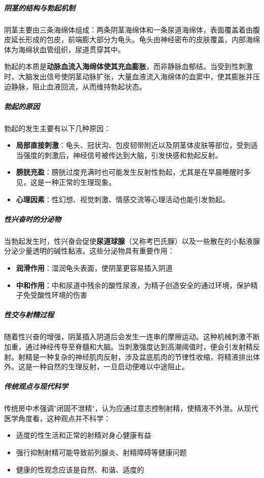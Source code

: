 \subparagraph{阴茎的结构与勃起机制}

阴茎主要由三条海绵体组成：两条阴茎海绵体和一条尿道海绵体，表面覆盖着由腹皮延长形成的包皮，前端膨大部分为龟头。龟头由神经密布的皮肤覆盖，内部海绵体为海绵状血管组织，尿道贯穿其中。

勃起的本质是\textbf{动脉血流入海绵体使其充血膨胀}，而非静脉血郁结。当受到性刺激时，大脑发出信号使阴茎动脉扩张，大量血液流入海绵体的血窦中，使其膨胀并压迫静脉，阻止血液回流，从而维持勃起状态。

\subparagraph{勃起的原因}

勃起的发生主要有以下几种原因：
\begin{itemize}
    \item \textbf{局部直接刺激}：龟头、冠状沟、包皮韧带附近以及阴茎体皮肤等部位，受到适当强度的刺激后，神经信号被传达到大脑，引发快感和勃起反射。
    \item \textbf{膀胱充盈}：膀胱过度充满时也可能发生反射性勃起，尤其是在早晨睡醒时多见，这是一种正常的生理现象。
    \item \textbf{心理因素}：性幻想、视觉刺激、情感交流等心理活动也能引发勃起。
\end{itemize}

\subparagraph{性兴奋时的分泌物}

当勃起发生时，性兴奋会促使\textbf{尿道球腺}（又称考巴氏腺）以及一些散在的小黏液腺分泌少量透明的碱性黏液。这些分泌物具有重要作用：
\begin{itemize}
    \item \textbf{润滑作用}：湿润龟头表面，使阴茎更容易插入阴道
    \item \textbf{中和作用}：中和尿道中残余的酸性尿液，为精子创造安全的通过环境，保护精子免受酸性环境的伤害
\end{itemize}

\subparagraph{性交与射精过程}

随着性兴奋的增强，阴茎插入阴道后会发生一连串的摩擦运动。这种机械刺激不断加重，通过神经传导至脊髓和大脑。当刺激强度达到高潮阈值时，便会引发射精反射。射精是一种复杂的神经肌肉反射，涉及盆底肌肉的节律性收缩，将精液排出体外。这是一种自然的生理反射，一旦启动便难以中途阻止。

\subparagraph{传统观点与现代科学}

传统房中术强调"闭固不泄精"，认为应通过意志控制射精，使精液不外泄。从现代医学角度看，这种观点并不科学：
\begin{itemize}
    \item 适度的性生活和正常的射精对身心健康有益
    \item 强行抑制射精可能导致前列腺炎、射精障碍等健康问题
    \item 健康的性观念应该是自然、和谐、适度的
\end{itemize}

